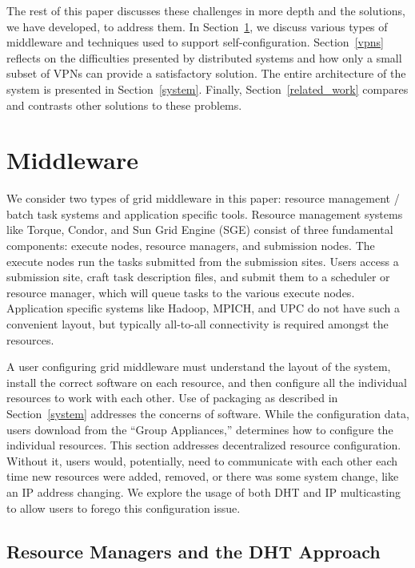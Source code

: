 \documentclass[conference]{IEEEtran}
\begin{document}
The rest of this paper discusses these challenges in more depth and the
solutions, we have developed, to address them.  In Section~\ref{middleware}, we
discuss various types of middleware and techniques used to support
self-configuration.  Section~\ref{vpns} reflects on the difficulties presented
by distributed systems and how only a small subset of VPNs can provide a
satisfactory solution.  The entire architecture of the system is presented in
Section~\ref{system}.  Finally, Section~\ref{related_work} compares and
contrasts other solutions to these problems.

\section{Middleware}
\label{middleware}

We consider two types of grid middleware in this paper:  resource management /
batch task systems and application specific tools.  Resource management systems
like Torque, Condor, and Sun Grid Engine (SGE) consist of three fundamental
components: execute nodes, resource managers, and submission nodes.  The
execute nodes run the tasks submitted from the submission sites.  Users access
a submission site, craft task description files, and submit them to a scheduler
or resource manager, which will queue tasks to the various execute nodes.
Application specific systems like Hadoop, MPICH, and UPC do not have such a
convenient layout, but typically all-to-all connectivity is required amongst
the resources.

A user configuring grid middleware must understand the layout of the system,
install the correct software on each resource, and then configure all the
individual resources to work with each other.  Use of packaging as described in
Section~\ref{system} addresses the concerns of software.  While the
configuration data, users download from the ``Group Appliances,'' determines
how to configure the individual resources.  This section addresses
decentralized resource configuration.  Without it, users would, potentially,
need to communicate with each other each time new resources were added,
removed, or there was some system change, like an IP address changing.  We
explore the usage of both DHT and IP multicasting to allow users to forego this
configuration issue.

\subsection{Resource Managers and the DHT Approach}
\end{document}
